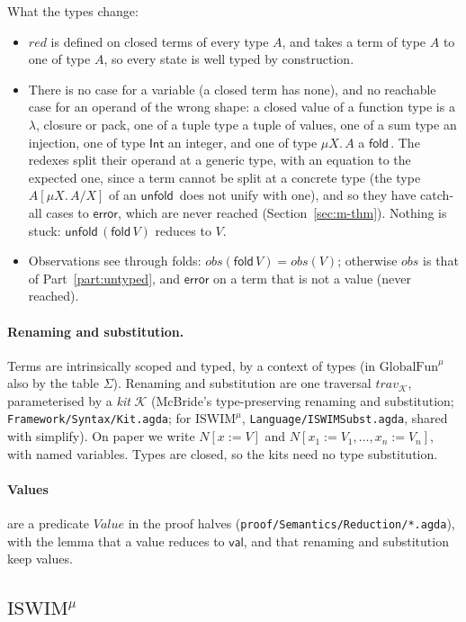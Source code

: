 \documentclass[10pt]{article}
\theoremstyle{acmplain}
\newcommand{\key}[1]{\mathsf{#1}}
\newcommand{\error}{\key{error}}
\newcommand{\obs}{\mathit{obs}}
\newcommand{\Ml}[1]{\textrm{#1}^{\mu}}                  %
\newcommand{\Mmu}[2]{\mu #1.\,#2}                         %
\newcommand{\Munroll}[2]{#2[\mu #1.\,#2/#1]}              %
\newcommand{\Mfold}{\key{fold}\,}
\newcommand{\Munfold}{\key{unfold}\,}
\begin{document}
What the types change:
\begin{itemize}
\item $\mathit{red}$ is defined on closed terms of every type $A$, and takes
  a term of type $A$ to one of type $A$, so every state is well typed by
  construction.
\item There is no case for a variable (a closed term has none), and no
  reachable case for an operand of the wrong shape: a closed value of a
  function type is a $\lambda$, closure or pack, one of a tuple type a tuple
  of values, one of a sum type an injection, one of type $\key{Int}$ an
  integer, and one of type $\Mmu{X}{A}$ a $\Mfold$. The redexes split their
  operand at a generic type, with an equation to the expected one, since a
  term cannot be split at a concrete type (the type $\Munroll{X}{A}$ of an
  $\Munfold$ does not unify with one), and so they have catch-all cases to
  $\error$, which are never reached (Section~\ref{sec:m-thm}). Nothing is
  stuck: $\Munfold(\Mfold V)$ reduces to $V$.
\item Observations see through folds: $\obs(\Mfold V) = \obs(V)$; otherwise
  $\obs$ is that of Part~\ref{part:untyped}, and $\error$ on a term that is
  not a value (never reached).
\end{itemize}

\paragraph{Renaming and substitution.}
Terms are intrinsically scoped and typed, by a context of types (in
$\Ml{GlobalFun}$ also by the table $\Sigma$). Renaming and substitution are one
traversal $\mathit{trav}_{\mathcal{K}}$, parameterised by a \emph{kit}
$\mathcal{K}$ (McBride's type-preserving renaming and substitution;
\texttt{Framework/Syntax/Kit.agda}; for $\Ml{ISWIM}$,
\texttt{Language/ISWIMSubst.agda}, shared with simplify). On paper we write
$N[x := V]$ and $N[x_1 := V_1, \ldots, x_n := V_n]$, with named variables.
Types are closed, so the kits need no type substitution.

\paragraph{Values} are a predicate $\mathit{Value}$ in the proof halves
(\texttt{proof/Semantics/Reduction/*.agda}), with the lemma that a value
reduces to $\key{val}$, and that renaming and substitution keep values.

\subsection{\texorpdfstring{$\Ml{ISWIM}$}{ISWIM-mu}}
\end{document}
